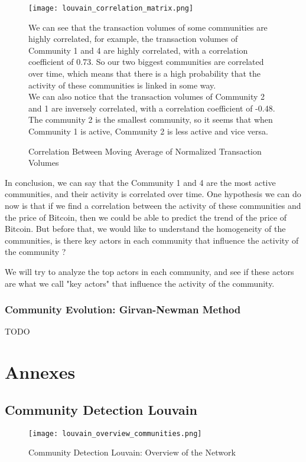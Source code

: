 \documentclass[a4paper, 12pt]{article}
\begin{document}
\begin{figure}[h]
    \begin{minipage}{0.5\linewidth}
        \texttt{[image: louvain\_correlation\_matrix.png]}
        \caption{Correlation Between Moving Average of Normalized Transaction Volumes}
        \label{fig:enter-label}
    \end{minipage}%
    \hspace{0.05\linewidth} %
    \begin{minipage}{0.45\linewidth}
        We can see that the transaction volumes of some communities are highly correlated, for example, the transaction volumes of Community 1 and 4 are highly correlated, with a correlation coefficient of 0.73. So our two biggest communities are correlated over time, which means that there is a high probability that the activity of these communities is linked in some way. \\
        
        We can also notice that the transaction volumes of Community 2 and 1 are inversely correlated, with a correlation coefficient of -0.48. The community 2 is the smallest community, so it seems that when Community 1 is active, Community 2 is less active and vice versa.
        \vfill
    \end{minipage}
\end{figure}


In conclusion, we can say that the Community 1 and 4 are the most active communities, and their activity is correlated over time. 
One hypothesis we can do now is that if we find a correlation between the activity of these communities and the price of Bitcoin, 
then we could be able to predict the trend of the price of Bitcoin. But before that, we would like to understand the homogeneity of the communities,
is there key actors in each community that influence the activity of the community ?

We will try to analyze the top actors in each community, and see if these actors are what we call "key actors" that influence the activity of the community.


\subsubsection{Community Evolution: Girvan-Newman Method}
TODO


\newpage

\section{Annexes}

\subsection{Community Detection Louvain}

\begin{figure}[h]
    \centering
    \texttt{[image: louvain\_overview\_communities.png]}
    \caption{Community Detection Louvain: Overview of the Network}
    \label{fig:louvain_overview_communities}
\end{figure}
\end{document}
